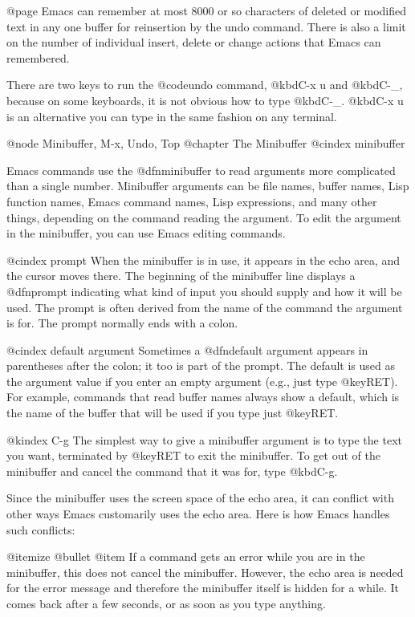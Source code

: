 {{@page
  Emacs can remember at most 8000 or so characters of deleted or
modified text in any one buffer for reinsertion by the undo command.
There is also a limit on the number of individual insert, delete or
change actions that Emacs can remembered.

  There are two keys to run the @code{undo} command, @kbd{C-x u} and
@kbd{C-_}, because on some keyboards, it is not obvious how to type
@kbd{C-_}. @kbd{C-x u} is an alternative you can type in the same
fashion on any terminal.

@node Minibuffer, M-x, Undo, Top
@chapter The Minibuffer
@cindex minibuffer

  Emacs commands use the @dfn{minibuffer} to read arguments more
complicated than a single number.  Minibuffer arguments can be file
names, buffer names, Lisp function names, Emacs command names, Lisp
expressions, and many other things, depending on the command reading the
argument.  To edit the argument in the minibuffer, you can use Emacs
editing commands.


@cindex prompt
  When the minibuffer is in use, it appears in the echo area, and the
cursor moves there.  The beginning of the minibuffer line displays a
@dfn{prompt} indicating what kind of input you should supply and how it
will be used.  The prompt is often derived from the name of the command
the argument is for.  The prompt normally ends with a colon.

@cindex default argument
  Sometimes a @dfn{default argument} appears in parentheses after the
colon; it too is part of the prompt.  The default is used as the
argument value if you enter an empty argument (e.g., just type @key{RET}).
For example, commands that read buffer names always show a default, which
is the name of the buffer that will be used if you type just @key{RET}.

@kindex C-g
  The simplest way to give a minibuffer argument is to type the text you
want, terminated by @key{RET} to exit the minibuffer.  To get out
of the minibuffer and cancel the command that it was for, type
@kbd{C-g}.

  Since the minibuffer uses the screen space of the echo area, it can
conflict with other ways Emacs customarily uses the echo area.  Here is how
Emacs handles such conflicts:

@itemize @bullet
@item
If a command gets an error while you are in the minibuffer, this does
not cancel the minibuffer.  However, the echo area is needed for the
error message and therefore the minibuffer itself is hidden for a
while.  It comes back after a few seconds, or as soon as you type
anything.

}}
